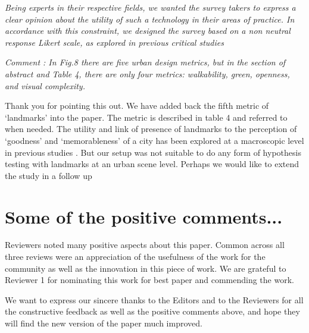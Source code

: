 \documentclass{paper}
\newenvironment{myquote}
{\definecolor{shadecolor}{rgb}{0.9,0.95,1} \begin{shaded*} \sf \em}
{\em\end{shaded*}}
\newenvironment{myquoteOrange}
{\definecolor{shadecolor}{rgb}{1,0.9,0.83} \begin{shaded*} \sf \em}
{\em\end{shaded*}}
\begin{document}
\begin{myquoteOrange}

\textit{Being experts in their respective fields, we wanted the survey takers to express a clear opinion about the utility of such a technology in their areas of practice. In accordance with this constraint, we designed the survey based on a non neutral response Likert scale, as explored in previous critical studies \cite{Agree2012,moors2008exploring}}

\end{myquoteOrange}


\begin{myquote}
\noindent Comment : In Fig.8 there are five urban design metrics, but in the section of abstract and Table 4, there are only four metrics: walkability, green, openness, and visual complexity. 
\end{myquote}

\noindent %
  
Thank you for pointing this out. We have added back the fifth metric of `landmarks' into the paper. The metric is described in table 4 and referred to when needed. The utility and link of presence of landmarks to the perception of `goodness' and `memorableness' of a city has been explored at a macroscopic level in previous studies \cite{quercia2014aesthetic,lynch1960image}. But our setup was not suitable to do any form of hypothesis testing with landmarks at an urban scene level. Perhaps we would like to extend the study in a follow up

\section*{Some of the positive comments...}

\begin{myquote}

\noindent Reviewers noted many positive aspects about this paper. Common across all three reviews were an appreciation of the usefulness of the work for the community as well as the innovation in this piece of work. We are grateful to Reviewer 1 for nominating this work for best paper and commending the work.  


\end{myquote}

We want to express our sincere thanks to the Editors and to the Reviewers for all the constructive feedback as well as the positive comments above, and hope they will find the new version of the paper much improved.


\end{document}
